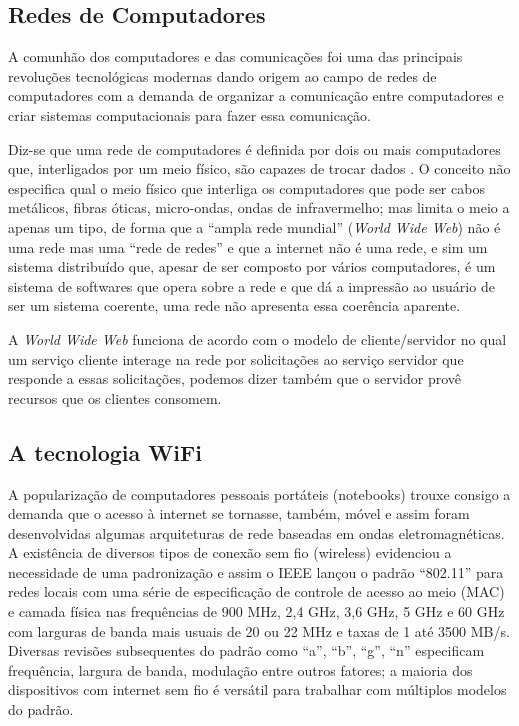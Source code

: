 \subsection{Redes de Computadores}

A comunhão dos computadores e das comunicações foi uma das principais revoluções tecnológicas modernas dando origem ao campo de redes de computadores com a demanda de organizar a comunicação entre computadores e criar sistemas computacionais para fazer essa comunicação.

Diz-se que uma rede de computadores é definida por dois ou mais computadores que, interligados por um meio físico, são capazes de trocar dados \cite{redes}. O conceito não especifica qual o meio físico que interliga os computadores que pode ser cabos metálicos, fibras óticas, micro-ondas, ondas de infravermelho; mas limita o meio a apenas um tipo, de forma que a “ampla rede mundial” (\textit{World Wide Web}) não é uma rede mas uma “rede de redes” e que a internet não é uma rede, e sim um sistema distribuído que, apesar de ser composto por vários computadores, é um sistema de softwares que opera sobre a rede e que dá a impressão ao usuário de ser um sistema coerente, uma rede não apresenta essa coerência aparente.

A \textit{World Wide Web} funciona de acordo com o modelo de cliente/servidor no qual um serviço cliente interage na rede por solicitações ao serviço servidor que responde a essas solicitações, podemos dizer também que o servidor provê recursos que os clientes consomem.

\subsection{A tecnologia \ac{WiFi}}

A popularização de computadores pessoais portáteis (notebooks) trouxe consigo a demanda que o acesso à internet se tornasse, também, móvel e assim foram desenvolvidas algumas arquiteturas de rede baseadas em ondas eletromagnéticas. A existência de diversos tipos de conexão sem fio (wireless) evidenciou a necessidade de uma padronização e assim o \ac{IEEE} lançou o padrão “802.11” para redes locais \cite{wifi} com uma série de especificação de controle de acesso ao meio (MAC) e camada física nas frequências de 900 MHz, 2,4 GHz, 3,6 GHz, 5 GHz e 60 GHz com larguras de banda mais usuais de 20 ou 22 MHz e taxas de 1 até 3500 MB/s. Diversas revisões subsequentes do padrão como “a”, “b”, “g”, “n” especificam frequência, largura de banda, modulação entre outros fatores; a maioria dos dispositivos com internet sem fio é versátil para trabalhar com múltiplos modelos do padrão.

